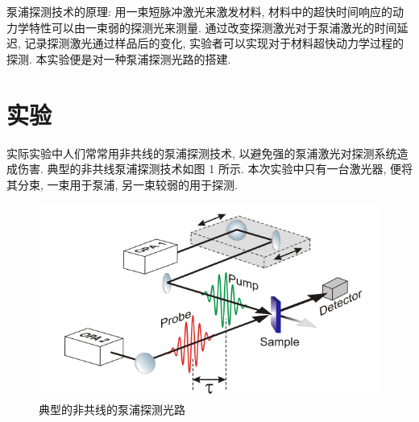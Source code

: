 \documentclass[aps,pre,12pt,preprint,%
	onecolumn,showpacs,showkeys,nofootinbib]{revtex4-2}
\begin{document}
泵浦探测技术的原理: 用一束短脉冲激光来激发材料, 材料中的超快时间响应的动力学特性可以由一束弱的探测光来测量. 通过改变探测激光对于泵浦激光的时间延迟, 记录探测激光通过样品后的变化, 实验者可以实现对于材料超快动力学过程的探测. 本实验便是对一种泵浦探测光路的搭建.
\section{实验}
实际实验中人们常常用非共线的泵浦探测技术, 以避免强的泵浦激光对探测系统造成伤害. 典型的非共线泵浦探测技术如图 1 所示. 本次实验中只有一台激光器, 便将其分束, 一束用于泵浦, 另一束较弱的用于探测.
	\begin{figure}[!h]
	\centering
	\includegraphics[width=.7\linewidth]{img/1.png}
	\caption[典型的非共线的泵浦探测光路]{典型的非共线的泵浦探测光路}\vspace{1ex}
	\end{figure}
\end{document}
